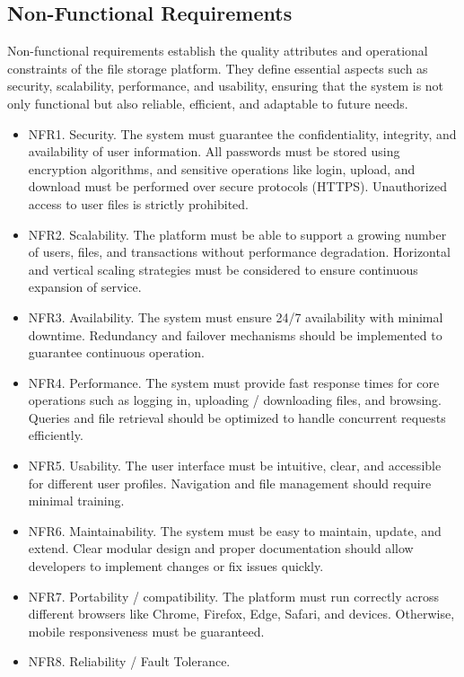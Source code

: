 \subsection{Non-Functional Requirements}
Non-functional requirements establish the quality attributes and operational constraints of the file storage platform. They define essential aspects such as security, scalability, performance, and usability, ensuring that the system is not only functional but also reliable, efficient, and adaptable to future needs.

\begin{itemize}
    \item NFR1. Security. The system must guarantee the confidentiality, integrity, and availability of user information. All passwords must be stored using encryption algorithms, and sensitive operations like login, upload, and download must be performed over secure protocols (HTTPS). Unauthorized access to user files is strictly prohibited.
    \item NFR2. Scalability.
    The platform must be able to support a growing number of users, files, and transactions without performance degradation. Horizontal and vertical scaling strategies must be considered to ensure continuous expansion of service.
    \item NFR3. Availability.
    The system must ensure 24/7 availability with minimal downtime. Redundancy and failover mechanisms should be implemented to guarantee continuous operation.
    \item NFR4. Performance.
    The system must provide fast response times for core operations such as logging in, uploading / downloading files, and browsing. Queries and file retrieval should be optimized to handle concurrent requests efficiently.
    \item NFR5. Usability.
    The user interface must be intuitive, clear, and accessible for different user profiles. Navigation and file management should require minimal training.
    \item NFR6. Maintainability.
    The system must be easy to maintain, update, and extend. Clear modular design and proper documentation should allow developers to implement changes or fix issues quickly.
    \item NFR7. Portability / compatibility.
    The platform must run correctly across different browsers like Chrome, Firefox, Edge, Safari, and devices. Otherwise, mobile responsiveness must be guaranteed.
    \item NFR8. Reliability / Fault Tolerance.

\end{itemize}
